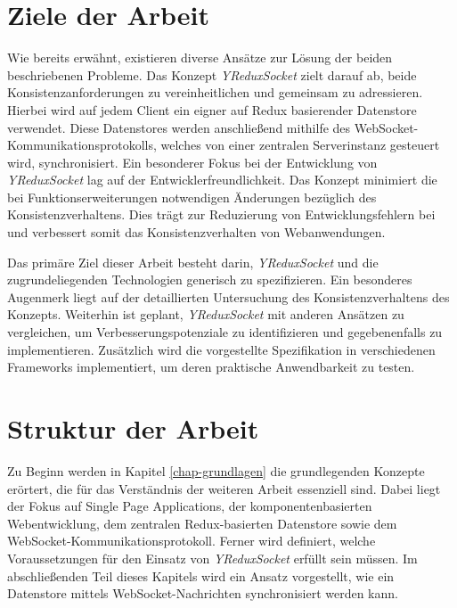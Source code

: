 \documentclass[12pt]{book}          %
\begin{document}
\section{Ziele der Arbeit}
\label{sec-ziele-der-arbeit}

Wie bereits erwähnt, existieren diverse Ansätze zur Lösung der beiden beschriebenen Probleme. Das Konzept \textit{YReduxSocket} zielt darauf ab, beide Konsistenzanforderungen zu vereinheitlichen und gemeinsam zu adressieren. Hierbei wird auf jedem Client ein eigner auf Redux basierender Datenstore verwendet. Diese Datenstores werden anschließend mithilfe des WebSocket-Kommunikationsprotokolls, welches von einer zentralen Serverinstanz gesteuert wird, synchronisiert. Ein besonderer Fokus bei der Entwicklung von \textit{YReduxSocket} lag auf der Entwicklerfreundlichkeit. Das Konzept minimiert die bei Funktionserweiterungen notwendigen Änderungen bezüglich des Konsistenzverhaltens. Dies trägt zur Reduzierung von Entwicklungsfehlern bei und verbessert somit das Konsistenzverhalten von Webanwendungen.

Das primäre Ziel dieser Arbeit besteht darin, \textit{YReduxSocket} und die zugrundeliegenden Technologien generisch zu spezifizieren. Ein besonderes Augenmerk liegt auf der detaillierten Untersuchung des Konsistenzverhaltens des Konzepts. Weiterhin ist geplant, \textit{YReduxSocket} mit anderen Ansätzen zu vergleichen, um Verbesserungspotenziale zu identifizieren und gegebenenfalls zu implementieren. Zusätzlich wird die vorgestellte Spezifikation in verschiedenen Frameworks implementiert, um deren praktische Anwendbarkeit zu testen. \\

\section{Struktur der Arbeit}
\label{sec-struktur-der-arbeit}

Zu Beginn werden in Kapitel \ref{chap-grundlagen} die grundlegenden Konzepte erörtert, die für das Verständnis der weiteren Arbeit essenziell sind. Dabei liegt der Fokus auf Single Page Applications, der komponentenbasierten Webentwicklung, dem zentralen Redux-basierten Datenstore sowie dem WebSocket-Kommunikationsprotokoll. Ferner wird definiert, welche Voraussetzungen für den Einsatz von \textit{YReduxSocket} erfüllt sein müssen. Im abschließenden Teil dieses Kapitels wird ein Ansatz vorgestellt, wie ein Datenstore mittels WebSocket-Nachrichten synchronisiert werden kann.
\end{document}
